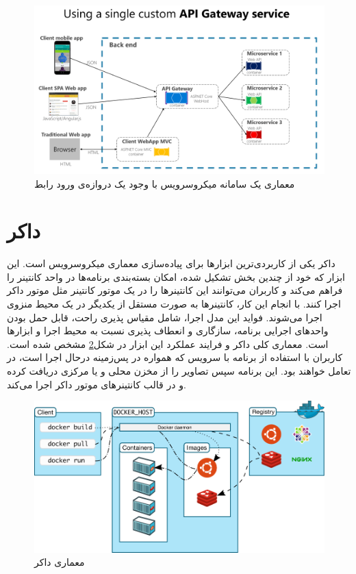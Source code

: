 \begin{figure}[h]
	\vspace{1cm}
	\centering
	\includegraphics[scale=0.4]{figures/custom-service-api-gateway.png}
	\caption{معماری یک سامانه میکروسرویس با وجود یک ‌دروازه‌ی ورود رابط\cite{Microsoft_API_Gateway_2023}}
	\label{fig:api-gateway}
\end{figure}

\section{داکر}
داکر یکی از کاربردی‌ترین ابزار‌ها برای پیاده‌سازی معماری میکروسرویس است. این ابزار که خود از چندین بخش تشکیل شده، امکان بسته‌بندی برنامه‌ها در واحد کانتینر را فراهم می‌کند و کاربران می‌توانند این کانتینر‌ها را در یک موتور کانتینر مثل موتور داکر اجرا کنند. با انجام این کار، کانتینرها به صورت مستقل از یکدیگر در یک محیط منزوی اجرا می‌شوند. فواید این مدل اجرا، شامل مقیاس پذیری راحت، قابل حمل بودن واحد‌های اجرایی برنامه، سازگاری و انعطاف پذیری نسبت به محیط اجرا و ابزار‌ها است. معماری کلی داکر و فرایند عملکرد این ابزار در شکل\ref{fig:docker-arch} مشخص شده است. کاربران با استفاده از برنامه  
با سرویس  که همواره در پس‌زمینه در‌حال اجرا است، در تعامل‌ خواهند بود. این برنامه سپس تصاویر را از مخزن محلی و یا مرکزی دریافت کرده و در قالب کانتینرهای موتور داکر اجرا‌ می‌کند.
\begin{figure}[h]
	\vspace{1cm}
	\centering
	\includegraphics[scale=0.4]{figures/docker-architecture.png}
	\caption{معماری داکر}
	\label{fig:docker-arch}
\end{figure}

